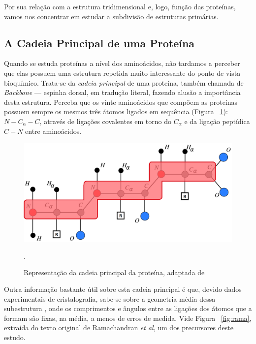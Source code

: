 Por sua relação com a estrutura tridimensional e, logo, função das proteínas, vamos nos concentrar em estudar a subdivisão de estruturas primárias. 

\subsection*{A Cadeia Principal de uma Proteína}
Quando se estuda proteínas a nível dos aminoácidos, não tardamos a perceber que elas possuem uma estrutura repetida muito interessante do ponto de vista bioquímico. Trata-se da \textit{cadeia principal} de uma proteína, também chamada de \textit{Backbone} --- espinha dorsal, em tradução literal, fazendo alusão a importância desta estrutura. Perceba que os vinte aminoácidos que compõem as proteínas possuem sempre os mesmos três átomos ligados em sequência (Figura ~\ref{fig:backbone}): $N-C_\alpha-C$, através de ligações covalentes em torno do $C_\alpha$ e da ligação peptídica $C-N$ entre aminoácidos.

\begin{figure}[H]
	\begin{center}
		\includegraphics[width=0.8\linewidth]{secProteins/figures/backbone.png}
	\end{center}
	\caption{Representação da cadeia principal da proteína, adaptada de  \cite{carlile:MinimalOrder}}.
	\label{fig:backbone}
\end{figure}

Outra informação bastante útil sobre esta cadeia principal é que, devido dados experimentais de cristalografia, sabe-se sobre a geometria média dessa subestrutura \cite{ramachandran1974MolStructure}, onde os comprimentos e ângulos entre  as ligações dos átomos que a formam são fixas, na média, a menos de erros de medida. Vide Figura ~\ref{fig:rama}, extraída do texto original de Ramachandran \textit{et al}, um dos precursores deste estudo.

